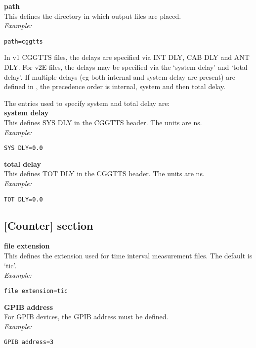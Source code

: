 {\bfseries path}\\
This defines the directory in which output files are placed.\\
\textit{Example:}
\begin{lstlisting}
path=cggtts
\end{lstlisting}

In v1 CGGTTS files, the delays are specified via INT DLY, CAB DLY and ANT DLY.  
For v2E files, the delays may be specified via the `system delay' and `total delay'.
If multiple delays (eg both internal and system delay are present) are defined in
, the precedence order is internal, system and then total delay.

The entries used to specify system and total delay are:\\

{\bfseries system delay}\\
This defines SYS DLY in the CGGTTS header. The units are ns.\\
\textit{Example:}
\begin{lstlisting}
SYS DLY=0.0
\end{lstlisting}

{\bfseries total delay}\\
This defines TOT DLY in the CGGTTS header. The units are ns.\\
\textit{Example:}
\begin{lstlisting}
TOT DLY=0.0
\end{lstlisting}

\subsection{[Counter] section}

\hypertarget{h:counter}{}

{\bfseries file extension}\\
This defines the extension used for time interval measurement files.
The default is `tic'.\\
\textit{Example:}
\begin{lstlisting}
file extension=tic
\end{lstlisting}

{\bfseries GPIB address}\\
For GPIB devices, the GPIB address must be defined.\\
\textit{Example:}
\begin{lstlisting}
GPIB address=3
\end{lstlisting}

